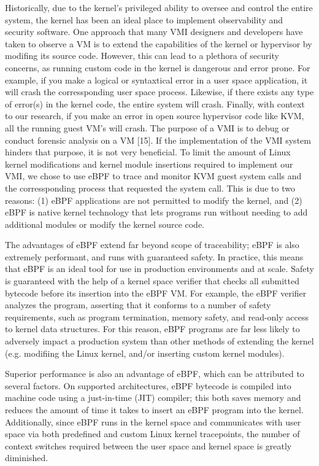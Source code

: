 \documentclass{report}
\begin{document}
\begin{spacing}{1.5}
{\large
Historically, due to the kernel’s privileged ability to oversee and control the entire system, the kernel has been an ideal place to implement observability and security software. One approach that many VMI designers and developers have taken to observe a VM is to extend the capabilities of the kernel or hypervisor by modifing its source code. However, this can lead to a plethora of security concerns, as running custom code in the kernel is dangerous and error prone. For example, if you make a logical or syntaxtical error in a user space application, it will crash the corressponding user space process. Likewise, if there exists any type of error(s) in the kernel code, the entire system will crash. Finally, with context to our research, if you make an error in open source hypervisor code like KVM, all the running guest VM's will crash. The purpose of a VMI is to debug or conduct forensic analysis on a VM [15]. If the implementation of the VMI system hinders that purpose, it is not very beneficial. To limit the amount of Linux kernel modifications and kernel module insertions required to implement our VMI, we chose to use eBPF to trace and monitor KVM guest system calls and the corressponding process that requested the system call. This is due to two reasons: (1) eBPF applications are not permitted to modify the kernel, and (2) eBPF is native kernel technology that lets programs run without needing to add additional modules or modify the kernel source code.
\newline
}

{\large
The advantages of eBPF extend far beyond scope of traceability; eBPF is also extremely performant, and runs with guaranteed safety. In practice, this means that eBPF is an ideal tool for use in production environments and at scale. Safety is guaranteed with the help of a kernel space verifier that checks all submitted bytecode before its insertion into the eBPF VM. For example, the eBPF verifier analyzes the program, asserting that it conforms to a number of safety requirements, such as program termination, memory safety, and read-only access to kernel data structures. For this reason, eBPF programs are far less likely to adversely impact a production system than other methods of extending the kernel (e.g. modifiing the Linux kernel, and/or inserting custom kernel modules).
\newline
}

{\large
Superior performance is also an advantage of eBPF, which can be attributed to several factors. On supported architectures, eBPF bytecode is compiled into machine code using a just-in-time (JIT) compiler; this both saves memory and reduces the amount of time it takes to insert an eBPF program into the kernel. Additionally, since eBPF runs in the kernel space and communicates with user space via both predefined and custom Linux kernel tracepoints, the number of context switches required between the user space and kernel space is greatly diminished.
\newline
}


\end{spacing}
\end{document}
